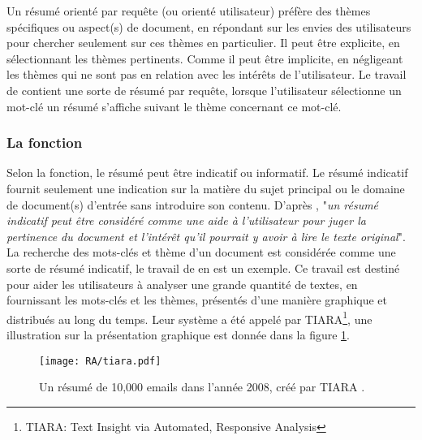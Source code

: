 \documentclass[a4paper,12pt,oneside]{../use/ESIthesis}
\begin{document}
Un résumé orienté par requête (ou orienté utilisateur) préfère des thèmes spécifiques ou aspect(s) de document, en répondant sur les envies des utilisateurs pour chercher seulement sur ces thèmes en particulier. 
Il peut être explicite, en sélectionnant les thèmes pertinents. 
Comme il peut être implicite, en négligeant les thèmes qui ne sont pas en relation avec les intérêts de l'utilisateur. 
Le travail de \cite{09-liu-al} contient une sorte de résumé par requête, lorsque l'utilisateur sélectionne un mot-clé un résumé s'affiche suivant le thème concernant ce mot-clé.

\subsubsection{La fonction}

Selon la fonction, le résumé peut être indicatif ou informatif. 
Le résumé indicatif fournit seulement une indication sur la matière du sujet principal ou le domaine de document(s) d'entrée sans introduire son contenu. 
D'après \cite{04-crispino-couto}, "\textit{un résumé indicatif peut être considéré comme une aide à l'utilisateur pour juger la pertinence du document et l'intérêt qu'il pourrait y avoir à lire le texte original}".
La recherche des mots-clés et thème d'un document est considérée comme une sorte de résumé indicatif, le travail de \cite{09-liu-al} en est un exemple. 
Ce travail est destiné pour aider les utilisateurs à analyser une grande quantité de textes, en fournissant les mots-clés et les thèmes, présentés d'une manière graphique et distribués au long du temps. 
Leur système a été appelé par TIARA\footnote{TIARA: Text Insight via Automated, Responsive Analysis}, une illustration sur la présentation graphique est donnée dans la figure \ref{fig:tiara}.
\begin{figure}[ht]
\begin{center}
\texttt{[image: RA/tiara.pdf]} %
 \caption[Un résumé de 10,000 emails dans l'année 2008, créé par TIARA]{Un résumé de 10,000 emails dans l'année 2008, créé par TIARA \cite{09-liu-al}.}
 \label{fig:tiara}
\end{center}
\end{figure}
\end{document}
